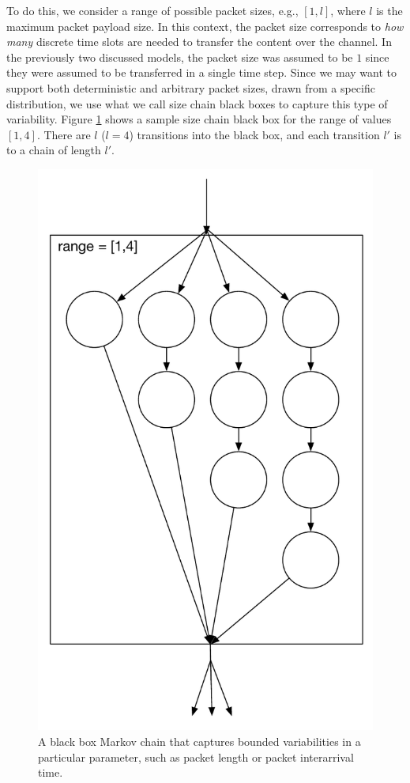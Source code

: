 \documentclass[conference]{IEEEtran}
\begin{document}
To do this, we consider a range of possible packet sizes, e.g., $[1,l]$, where $l$ is the maximum packet payload size. In this context, the packet size corresponds to \emph{how many} discrete time slots are needed to transfer the content over the channel. In the previously two discussed models, the packet size was assumed to be $1$ since they were assumed to be transferred in a single time step. Since we may want to support both deterministic and arbitrary packet sizes, drawn from a specific distribution, we use what we call size chain black boxes to capture this type of variability. Figure \ref{fig:size_chain} shows a sample size chain black box for the range of values $[1,4]$. There are $l$ ($l = 4$) transitions into the black box, and each transition $l'$ is to a chain of length $l'$. 

\begin{figure}
\begin{center}
\includegraphics[scale=0.35]{../../sketches/size_chain_old.pdf}
\caption{A black box Markov chain that captures bounded variabilities in a particular parameter, such as packet length or packet interarrival time.}
\label{fig:size_chain}
\end{center}
\end{figure}
\end{document}
